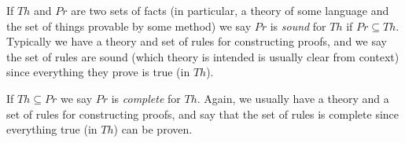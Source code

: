\documentclass[12pt]{article}
\begin{document}
If $Th$ and $Pr$ are two sets of facts (in particular, a theory of some language and the set of things provable by some method) we say $Pr$ is \emph{sound} for $Th$ if $Pr\subseteq Th$.  Typically we have a theory and set of rules for constructing proofs, and we say the set of rules are sound (which theory is intended is usually clear from context) since everything they prove is true (in $Th$).

If $Th\subseteq Pr$ we say $Pr$ is \emph{complete} for $Th$.  Again, we usually have a theory and a set of rules for constructing proofs, and say that the set of rules is complete since everything true (in $Th$) can be proven.
\end{document}
